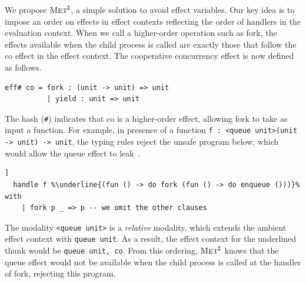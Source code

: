 \documentclass[sigplan, nonacm, natbib = false, review, screen]{acmart}
\newcommand{\Met}{\textsc{Met}\xspace}
\newcommand{\MetHO}{$\Met^\sharp$\xspace}
\begin{document}
We propose \MetHO, a simple solution to avoid effect variables.
%
Our key idea is to impose an order on effects in effect contexts
reflecting the order of handlers in the evaluation context.
%
When we call a higher-order operation such as fork, the
effects available when the child process is called are exactly those
that follow the \textsf{co} effect in the effect context.
%
%
%
%
The cooperative concurrency effect is now defined as follows.
\begin{lstlisting}[style=metl]
  eff# co = fork : (unit -> unit) => unit
          | yield : unit => unit
\end{lstlisting}
The hash (\texttt{\small \#}) indicates that \textsf{co} is a higher-order effect, allowing \textsf{fork} to take as input a function.
%
%
%
For example, in presence of a function
\lstinline[style = metl]{f : <queue unit>(unit -> unit) -> unit}, the typing
rules reject the unsafe program below, which would allow the queue effect to
leak~\cite[Section~2.10]{tang2025modal}.
\begin{lstlisting}[style = metl,escapechar=\%]]
  handle f %\underline{(fun () -> do fork (fun () -> do enqueue ()))}% with
    | fork p _ => p -- we omit the other clauses
\end{lstlisting}
The modality \lstinline[style = metl]{<queue unit>} is
%
a \emph{relative} modality, which extends the ambient effect context
with \lstinline{queue unit}.
%
As a result, the effect context for the underlined thunk would be
\lstinline[style = metl]{queue unit, co}.
%
From this ordering, \MetHO knows that the queue effect would not be
available when the child process is called at the handler of
\textsf{fork}, rejecting this program.
\end{document}
